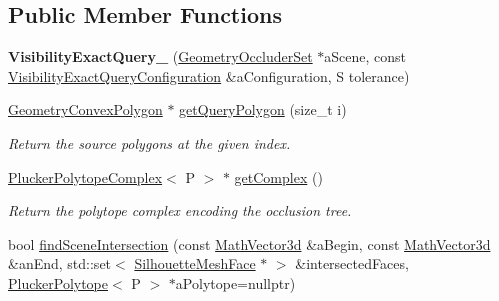 \subsection*{Public Member Functions}
\begin{DoxyCompactItemize}
\item 
\mbox{\label{classvisilib_1_1_visibility_exact_query___a3da2482adc2bf3c520d602162a508806}} 
{\bfseries Visibility\+Exact\+Query\+\_\+} (\mbox{\hyperlink{classvisilib_1_1_geometry_occluder_set}{Geometry\+Occluder\+Set}} $\ast$a\+Scene, const \mbox{\hyperlink{structvisilib_1_1_visibility_exact_query_configuration}{Visibility\+Exact\+Query\+Configuration}} \&a\+Configuration, S tolerance)
\item 
\mbox{\label{classvisilib_1_1_visibility_exact_query___a55b73c33132ac9b5ef6050a6fd6d699a}} 
\mbox{\hyperlink{classvisilib_1_1_geometry_convex_polygon}{Geometry\+Convex\+Polygon}} $\ast$ \mbox{\hyperlink{classvisilib_1_1_visibility_exact_query___a55b73c33132ac9b5ef6050a6fd6d699a}{get\+Query\+Polygon}} (size\+\_\+t i)
\begin{DoxyCompactList}\small\item\em Return the source polygons at the given index. \end{DoxyCompactList}\item 
\mbox{\label{classvisilib_1_1_visibility_exact_query___a1178db030d410172cb263526bda7e119}} 
\mbox{\hyperlink{classvisilib_1_1_plucker_polytope_complex}{Plucker\+Polytope\+Complex}}$<$ P $>$ $\ast$ \mbox{\hyperlink{classvisilib_1_1_visibility_exact_query___a1178db030d410172cb263526bda7e119}{get\+Complex}} ()
\begin{DoxyCompactList}\small\item\em Return the polytope complex encoding the occlusion tree. \end{DoxyCompactList}\item 
bool \mbox{\hyperlink{classvisilib_1_1_visibility_exact_query___a9aecc3e02e9f23bfd1911f67833db419}{find\+Scene\+Intersection}} (const \mbox{\hyperlink{classvisilib_1_1_math_vector3__}{Math\+Vector3d}} \&a\+Begin, const \mbox{\hyperlink{classvisilib_1_1_math_vector3__}{Math\+Vector3d}} \&an\+End, std\+::set$<$ \mbox{\hyperlink{classvisilib_1_1_silhouette_mesh_face}{Silhouette\+Mesh\+Face}} $\ast$ $>$ \&intersected\+Faces, \mbox{\hyperlink{classvisilib_1_1_plucker_polytope}{Plucker\+Polytope}}$<$ P $>$ $\ast$a\+Polytope=nullptr)

\end{DoxyCompactItemize}
